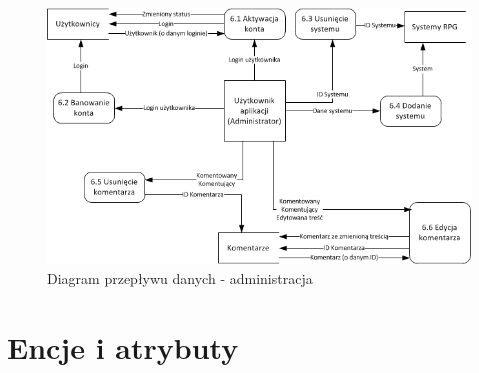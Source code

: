 \begin{figure}[h!]
\begin{center}
\centerline{\includegraphics[scale=1]{./img/DFD-admin.png}}
\caption[Diagram przepływu danych - administracja]{Diagram przepływu danych - administracja}
\label{fig:DFD-admin}
\end{center}
\end{figure}



\clearpage
\section{Encje i atrybuty}
\label{sec:encje}

